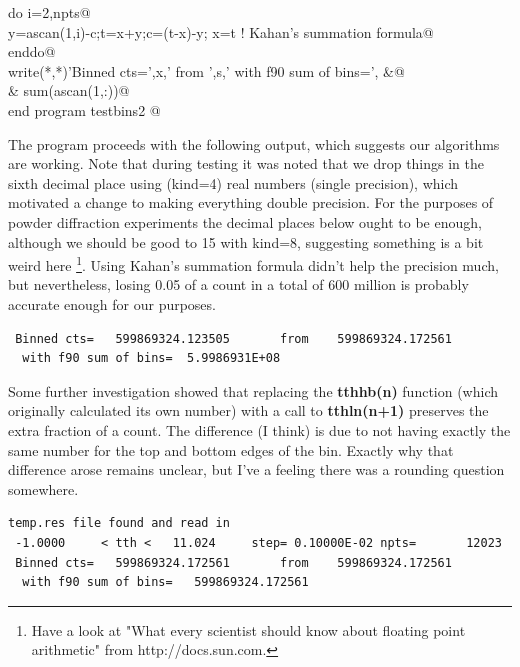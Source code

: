 \documentclass[10pt,a4paper,notitlepage]{article}
\newcommand{\code}[1]{\textbf{\textsf{#1}}} %
\begin{document}
\begin{flushleft}
\begin{minipage}{\linewidth}
\begin{list}{}{}
\mbox{}\verb@      do i=2,npts@\\
\mbox{}\verb@        y=ascan(1,i)-c;t=x+y;c=(t-x)-y; x=t   ! Kahan's summation formula@\\
\mbox{}\verb@      enddo@\\
\mbox{}\verb@      write(*,*)'Binned cts=',x,' from ',s,' with f90 sum of bins=',    &@\\
\mbox{}\verb@     & sum(ascan(1,:))@\\
\mbox{}\verb@      end program testbins2                                                  @{\NWsep}
\end{list}
\vspace{-1.5ex}
\footnotesize
\begin{list}{}{\setlength{\itemsep}{-\parsep}\setlength{\itemindent}{-\leftmargin}}

\item{}
\end{list}
\end{minipage}\vspace{4ex}
\end{flushleft}
The program proceeds with the following output, which suggests our
algorithms are working. Note that during testing it was noted that
we drop things in the sixth decimal place using (kind=4) real numbers
(single precision), which motivated a change to making everything 
double precision. For the purposes of powder diffraction experiments
the decimal places below ought to be enough, although we should be 
good to 15 with kind=8, suggesting something is a bit weird here
\footnote{Have a look at "What every scientist should know about 
floating point arithmetic" from http://docs.sun.com.
}. Using Kahan's summation formula didn't help the precision much,
but nevertheless, losing 0.05 of a count in a total of 600 million
is probably accurate enough for our purposes.
\begin{verbatim}
 Binned cts=   599869324.123505       from    599869324.172561
  with f90 sum of bins=  5.9986931E+08
\end{verbatim}
Some further investigation showed that replacing the \code{tthhb(n)} function
(which originally calculated its own number) with a call to \code{tthln(n+1)}
preserves the extra fraction of a count. The difference (I think) is due to 
not having exactly the same number for the top and bottom edges of the bin.
Exactly why that difference arose remains unclear, but I've a feeling there
was a rounding question somewhere.
\begin{verbatim}
temp.res file found and read in
 -1.0000     < tth <   11.024     step= 0.10000E-02 npts=       12023
 Binned cts=   599869324.172561       from    599869324.172561
  with f90 sum of bins=   599869324.172561
\end{verbatim}
\end{document}
